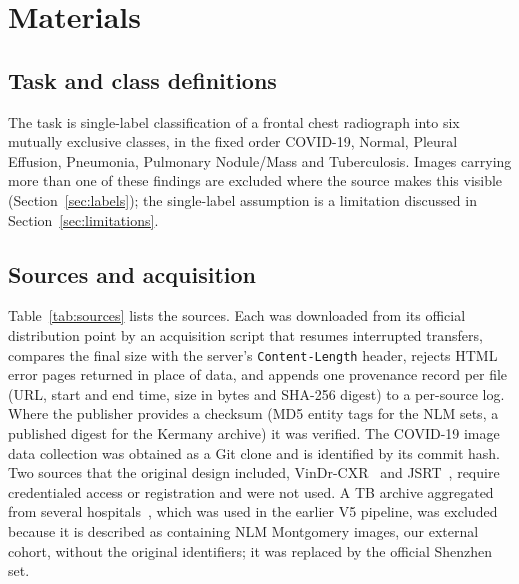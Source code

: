\section{Materials}
\label{sec:materials}

\subsection{Task and class definitions}
The task is single-label classification of a frontal chest radiograph into six mutually exclusive classes, in the fixed order COVID-19, Normal, Pleural Effusion, Pneumonia, Pulmonary Nodule/Mass and Tuberculosis. Images carrying more than one of these findings are excluded where the source makes this visible (Section~\ref{sec:labels}); the single-label assumption is a limitation discussed in Section~\ref{sec:limitations}.

\subsection{Sources and acquisition}
\label{sec:sources}
Table~\ref{tab:sources} lists the sources. Each was downloaded from its official distribution point by an acquisition script that resumes interrupted transfers, compares the final size with the server's \texttt{Content-Length} header, rejects HTML error pages returned in place of data, and appends one provenance record per file (URL, start and end time, size in bytes and SHA-256 digest) to a per-source log. Where the publisher provides a checksum (MD5 entity tags for the NLM sets, a published digest for the Kermany archive) it was verified. The COVID-19 image data collection was obtained as a Git clone and is identified by its commit hash. Two sources that the original design included, VinDr-CXR~\cite{nguyen2022vindr} and JSRT~\cite{shiraishi2000development}, require credentialed access or registration and were not used. A TB archive aggregated from several hospitals~\cite{rahman2020reliable}, which was used in the earlier V5 pipeline, was excluded because it is described as containing NLM Montgomery images, our external cohort, without the original identifiers; it was replaced by the official Shenzhen set.

